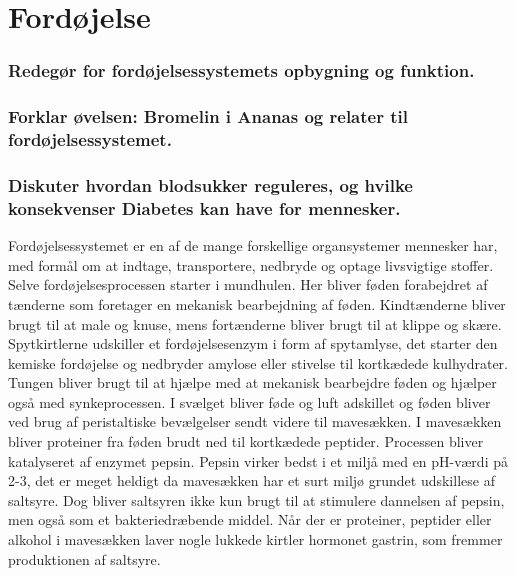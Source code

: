\newpage
\part{Fordøjelse}
\section*{Redegør for fordøjelsessystemets opbygning og funktion.}
\section*{Forklar øvelsen: Bromelin i Ananas og relater til fordøjelsessystemet.}
\section*{Diskuter hvordan blodsukker reguleres, og hvilke konsekvenser Diabetes kan have for mennesker.}
Fordøjelsessystemet er en af de mange forskellige organsystemer mennesker har, med formål om at indtage, transportere, nedbryde og optage livsvigtige stoffer. 
Selve fordøjelsesprocessen starter i mundhulen. Her bliver føden forabejdret af tænderne som foretager en mekanisk bearbejdning af føden. Kindtænderne bliver brugt til at male og knuse, mens fortænderne bliver brugt til at klippe og skære. Spytkirtlerne udskiller et fordøjelsesenzym i form af spytamlyse, det starter den kemiske fordøjelse og nedbryder amylose eller stivelse til kortkædede kulhydrater. Tungen bliver brugt til at hjælpe med at mekanisk bearbejdre føden og hjælper også med synkeprocessen. I svælget bliver føde og luft adskillet og føden bliver ved brug af peristaltiske bevælgelser sendt videre til mavesækken.
I mavesækken bliver proteiner fra føden brudt ned til kortkædede peptider. Processen bliver katalyseret af enzymet pepsin. Pepsin virker bedst i et miljå med en pH-værdi på 2-3, det er meget heldigt da mavesækken har et surt miljø grundet udskillese af saltsyre. Dog bliver saltsyren ikke kun brugt til at stimulere dannelsen af pepsin, men også som et bakteriedræbende middel. Når der er proteiner, peptider eller alkohol i mavesækken laver nogle lukkede kirtler hormonet gastrin, som fremmer produktionen af saltsyre.
